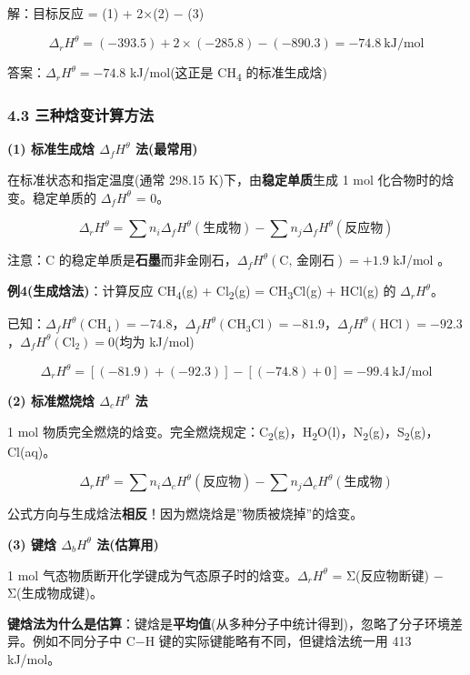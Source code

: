 解：目标反应 = (1) + 2×(2) − (3)

\[\Delta_r H^\theta = (-393.5) + 2 \times (-285.8) - (-890.3) = -74.8\ \mathrm{kJ/mol}\]

答案：\(\Delta_r H^\theta = -74.8\) kJ/mol(这正是 CH\textsubscript{4} 的标准生成焓)

\subsubsection{4.3 三种焓变计算方法}\label{ux4e09ux79cdux7113ux53d8ux8ba1ux7b97ux65b9ux6cd5}

\textbf{(1) 标准生成焓 \(\Delta_f H^\theta\) 法(最常用)}

在标准状态和指定温度(通常 298.15 K)下，由\textbf{稳定单质}生成 1 mol 化合物时的焓变。稳定单质的 \(\Delta_f H^\theta\) = 0。

\[
\boxed{\Delta_r H^\theta = \sum n_i \Delta_f H^\theta(\text{生成物}) - \sum n_j \Delta_f H^\theta(\text{反应物})}
\]

注意：C 的稳定单质是\textbf{石墨}而非金刚石，\(\Delta_f H^\theta(\text{C, 金刚石}) = +1.9\) kJ/mol 。

\textbf{例4(生成焓法)}：计算反应 CH\textsubscript{4}(g) + Cl\textsubscript{2}(g) = CH\textsubscript{3}Cl(g) + HCl(g) 的 \(\Delta_r H^\theta\)。

已知：\(\Delta_f H^\theta(\text{CH}_4) = -74.8\)，\(\Delta_f H^\theta(\text{CH}_3\text{Cl}) = -81.9\)，\(\Delta_f H^\theta(\text{HCl}) = -92.3\)，\(\Delta_f H^\theta(\text{Cl}_2) = 0\)(均为 kJ/mol)

\[\Delta_r H^\theta = [(-81.9) + (-92.3)] - [(-74.8) + 0] = -99.4\ \mathrm{kJ/mol}\]

\textbf{(2) 标准燃烧焓 \(\Delta_c H^\theta\) 法}

1 mol 物质完全燃烧的焓变。完全燃烧规定：C\textsubscript{2}(g)，H\textsubscript{2}O(l)，N\textsubscript{2}(g)，S\textsubscript{2}(g)，Cl(aq)。

\[
\Delta_r H^\theta = \sum n_i \Delta_c H^\theta(\text{反应物}) - \sum n_j \Delta_c H^\theta(\text{生成物})
\]

公式方向与生成焓法\textbf{相反}！因为燃烧焓是''物质被烧掉''的焓变。

\textbf{(3) 键焓 \(\Delta_b H^\theta\) 法(估算用)}

1 mol 气态物质断开化学键成为气态原子时的焓变。\(\Delta_r H^\theta\) = Σ(反应物断键) − Σ(生成物成键)。

\textbf{键焓法为什么是估算}：键焓是\textbf{平均值}(从多种分子中统计得到)，忽略了分子环境差异。例如不同分子中 C−H 键的实际键能略有不同，但键焓法统一用 413 kJ/mol。

